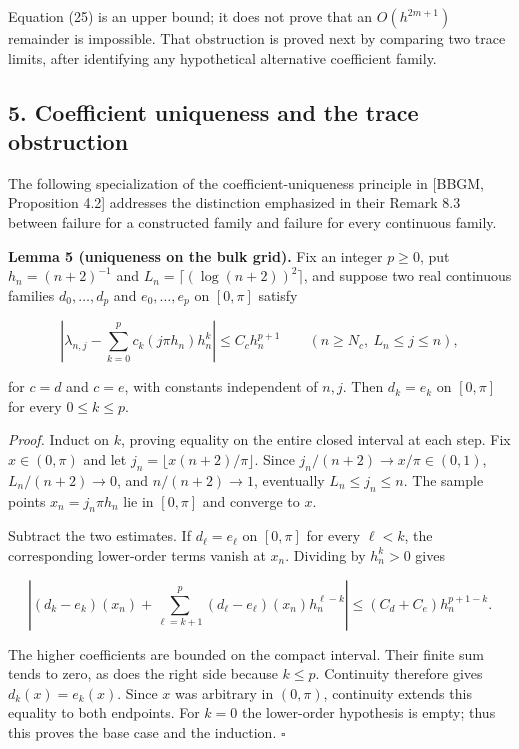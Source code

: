 \documentclass[10pt,a4paper]{article}
\begin{document}
Equation (25) is an upper bound; it does not prove that an \(O(h^{2m+1})\) remainder is impossible. That obstruction is proved next by comparing two trace limits, after identifying any hypothetical alternative coefficient family.

\subsection{5. Coefficient uniqueness and the trace obstruction}\label{coefficient-uniqueness-and-the-trace-obstruction}

The following specialization of the coefficient-uniqueness principle in {[}BBGM, Proposition 4.2{]} addresses the distinction emphasized in their Remark 8.3 between failure for a constructed family and failure for every continuous family.

\textbf{Lemma 5 (uniqueness on the bulk grid).} Fix an integer \(p\ge0\), put \(h_n=(n+2)^{-1}\) and \(L_n=\lceil(\log(n+2))^2\rceil\), and suppose two real continuous families \(d_0,\ldots,d_p\) and \(e_0,\ldots,e_p\) on \([0,\pi]\) satisfy

\nopagebreak[3]
\[
\left|\lambda_{n,j}-\sum_{k=0}^p c_k(j\pi h_n)h_n^k\right|
\le C_c h_n^{p+1}
\qquad(n\ge N_c,\ L_n\le j\le n),
\]

for \(c=d\) and \(c=e\), with constants independent of \(n,j\). Then \(d_k=e_k\) on \([0,\pi]\) for every \(0\le k\le p\).

\emph{Proof.} Induct on \(k\), proving equality on the entire closed interval at each step. Fix \(x\in(0,\pi)\) and let \(j_n=\lfloor x(n+2)/\pi\rfloor\). Since \(j_n/(n+2)\to x/\pi\in(0,1)\), \(L_n/(n+2)\to0\), and \(n/(n+2)\to1\), eventually \(L_n\le j_n\le n\). The sample points \(x_n=j_n\pi h_n\) lie in \([0,\pi]\) and converge to \(x\).

Subtract the two estimates. If \(d_\ell=e_\ell\) on \([0,\pi]\) for every \(\ell<k\), the corresponding lower-order terms vanish at \(x_n\). Dividing by \(h_n^k>0\) gives

\nopagebreak[3]
\[
\left|(d_k-e_k)(x_n)+
\sum_{\ell=k+1}^p(d_\ell-e_\ell)(x_n)h_n^{\ell-k}\right|
\le(C_d+C_e)h_n^{p+1-k}.
\]

The higher coefficients are bounded on the compact interval. Their finite sum tends to zero, as does the right side because \(k\le p\). Continuity therefore gives \(d_k(x)=e_k(x)\). Since \(x\) was arbitrary in \((0,\pi)\), continuity extends this equality to both endpoints. For \(k=0\) the lower-order hypothesis is empty; thus this proves the base case and the induction. \(\square\)
\end{document}
